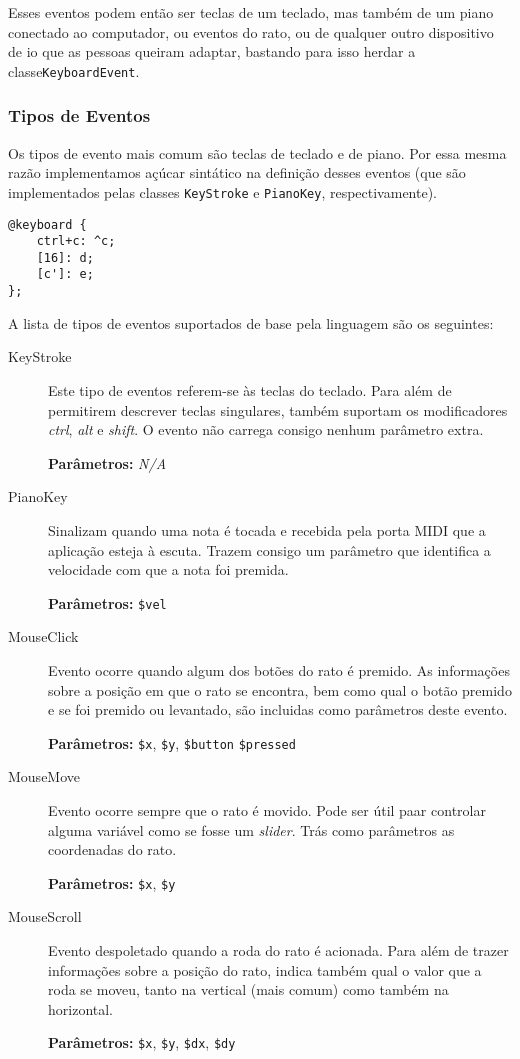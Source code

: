 Esses eventos podem então ser teclas de um teclado, mas também de um piano conectado ao computador, ou eventos do rato, ou de qualquer outro dispositivo de \acrshort{io} que as pessoas queiram adaptar, bastando para isso herdar a classe\texttt{KeyboardEvent}.

\subsubsection{Tipos de Eventos}
Os tipos de evento mais comum são teclas de teclado e de piano. Por essa mesma razão implementamos açúcar sintático na definição desses eventos  (que são implementados pelas classes \texttt{KeyStroke} e \texttt{PianoKey}, respectivamente).

\begin{lstlisting}[caption={Declaração de três eventos, o primeiro é uma combinação de teclas, o segundo referência o \textit{virtual key code}, e o terceiro uma nota MIDI}]
@keyboard {
    ctrl+c: ^c;
    [16]: d;
    [c']: e;
};
\end{lstlisting}

A lista de tipos de eventos suportados de base pela linguagem são os seguintes:
\begin{description}
 \item[KeyStroke]
 Este tipo de eventos referem-se às teclas do teclado. Para além de permitirem descrever teclas singulares, também suportam os modificadores \textit{ctrl}, \textit{alt} e \textit{shift}. O evento não carrega consigo nenhum parâmetro extra.
 
 \textbf{Parâmetros:} \textit{N/A}
 \item[PianoKey] Sinalizam quando uma nota é tocada e recebida pela porta MIDI que a aplicação esteja à escuta. Trazem consigo um parâmetro que identifica a velocidade com que a nota foi premida.
 
 \textbf{Parâmetros:} \texttt{\$vel}
 \item[MouseClick] Evento ocorre quando algum dos botões do rato é premido. As informações sobre a posição em que o rato se encontra, bem como qual o botão premido e se foi premido ou levantado, são incluidas como parâmetros deste evento.
 
 \textbf{Parâmetros:} \texttt{\$x}, \texttt{\$y}, \texttt{\$button} \texttt{\$pressed}
 \item[MouseMove] Evento ocorre sempre que o rato é movido. Pode ser útil paar controlar alguma variável como se fosse um \textit{slider}. Trás como parâmetros as coordenadas do rato.
 
 \textbf{Parâmetros:} \texttt{\$x}, \texttt{\$y}
 \item[MouseScroll] Evento despoletado quando a roda do rato é acionada. Para além de trazer informações sobre a posição do rato, indica também qual o valor que a roda se moveu, tanto na vertical (mais comum) como também na horizontal.
 
 \textbf{Parâmetros:} \texttt{\$x}, \texttt{\$y}, \texttt{\$dx}, \texttt{\$dy}
\end{description}

